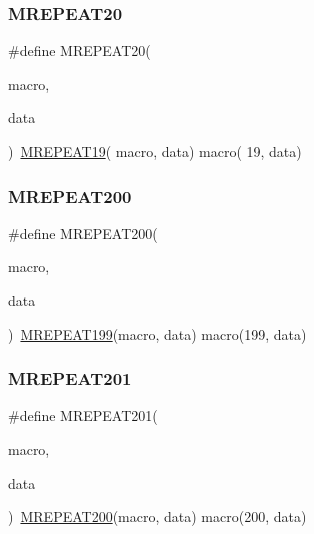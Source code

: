 \mbox{\label{group__group__sam0__utils__mrepeat_ga938b8f75b8eedaadcfec2c375f7c7d2a}} 
\subsubsection{\texorpdfstring{MREPEAT20}{MREPEAT20}}
{\footnotesize\ttfamily \#define M\+R\+E\+P\+E\+A\+T20(\begin{DoxyParamCaption}\item[{}]{macro,  }\item[{}]{data }\end{DoxyParamCaption})~\mbox{\hyperlink{group__group__sam0__utils__mrepeat_ga9062731e6246bd538334f265e34870df}{M\+R\+E\+P\+E\+A\+T19}}( macro, data)   macro( 19, data)}

\mbox{\label{group__group__sam0__utils__mrepeat_gad87de52b3036ad813d9f01fe6dc57d38}} 
\subsubsection{\texorpdfstring{MREPEAT200}{MREPEAT200}}
{\footnotesize\ttfamily \#define M\+R\+E\+P\+E\+A\+T200(\begin{DoxyParamCaption}\item[{}]{macro,  }\item[{}]{data }\end{DoxyParamCaption})~\mbox{\hyperlink{group__group__sam0__utils__mrepeat_gae89c87df1febe41c657bbbff536a77fa}{M\+R\+E\+P\+E\+A\+T199}}(macro, data)   macro(199, data)}

\mbox{\label{group__group__sam0__utils__mrepeat_gae15bf8ac240e5b8bb7d7fc73c7b58e41}} 
\subsubsection{\texorpdfstring{MREPEAT201}{MREPEAT201}}
{\footnotesize\ttfamily \#define M\+R\+E\+P\+E\+A\+T201(\begin{DoxyParamCaption}\item[{}]{macro,  }\item[{}]{data }\end{DoxyParamCaption})~\mbox{\hyperlink{group__group__sam0__utils__mrepeat_gad87de52b3036ad813d9f01fe6dc57d38}{M\+R\+E\+P\+E\+A\+T200}}(macro, data)   macro(200, data)}

